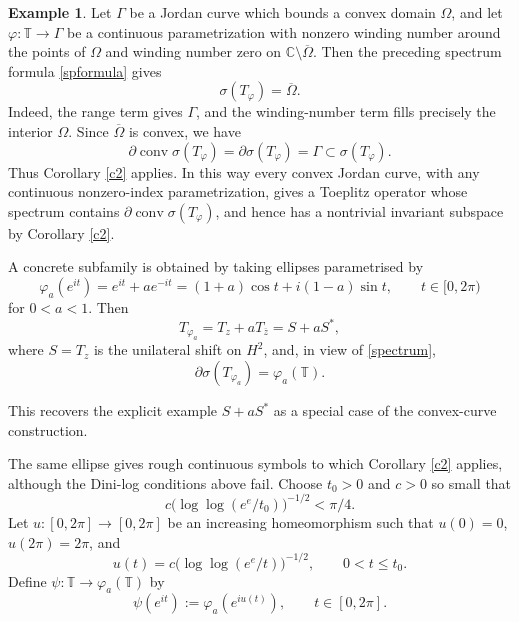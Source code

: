 \documentclass[11pt]{amsart}
\numberwithin{equation}{section}
\theoremstyle{definition}
\newtheorem{example}[theorem]{Example}
\theoremstyle{remark}
\DeclareMathOperator{\conv}{conv}
\newcommand{\CC}{\mathbb{C}}
\newcommand{\TT}{\mathbb{T}}
\begin{document}
\begin{example}\label{ex-convex-jordan-toeplitz}
Let $\Gamma$ be a Jordan curve which bounds a convex domain $\Omega$, and let $\varphi:\TT\to\Gamma$ be a continuous parametrization with nonzero winding number around the points of $\Omega$ and winding number zero on $\CC\setminus\overline\Omega$. Then the preceding spectrum formula \eqref{spformula} gives
\begin{equation}\label{spectrum}
    \sigma(T_\varphi)=\overline\Omega.
\end{equation}
Indeed, the range term gives $\Gamma$, and the winding-number term fills precisely the interior $\Omega$. Since $\overline\Omega$ is convex, we have
$$
\partial\conv\sigma(T_\varphi)=\partial\sigma(T_\varphi)=\Gamma\subset\sigma(T_\varphi).
$$
Thus Corollary \ref{c2} applies. In this way every convex Jordan curve, with any continuous nonzero-index parametrization, gives a Toeplitz operator whose spectrum contains $\partial\operatorname{conv}\sigma(T_\varphi)$, and hence has a nontrivial invariant subspace by Corollary \ref{c2}.

A concrete subfamily is obtained by taking ellipses parametrised by
$$
    \varphi_a(e^{it})=e^{it}+a e^{-it}=(1+a)\cos t+i(1-a)\sin t,\qquad t \in [0,2\pi)
$$
for $0<a<1.$ Then
$$
    T_{\varphi_a}=T_z+aT_{\overline z}=S+aS^*,
$$
where $S=T_z$ is the unilateral shift on $H^2$, 
and, in view of \eqref{spectrum},
$$
\partial \sigma(T_{\varphi_a})= \varphi_a(\mathbb T).
$$

This recovers the explicit example $S+aS^*$ as a special case of the convex-curve construction.

The same ellipse gives rough continuous symbols to which Corollary \ref{c2} applies, although the Dini-log conditions above fail.
Choose $t_0>0$ and $c>0$ so small that
$$
    c\bigl(\log\log(e^e/t_0)\bigr)^{-1/2}<\pi/4.
$$
Let $u:[0,2\pi]\to[0,2\pi]$ be an increasing homeomorphism such that
$u(0)=0$, $u(2\pi)=2\pi$, and
$$
    u(t)=c\bigl(\log\log(e^e/t)\bigr)^{-1/2},
    \qquad 0<t\le t_0 .
$$
Define \(\psi:\mathbb T\to \varphi_a(\mathbb T)\) by
$$
    \psi(e^{it}):=\varphi_a(e^{iu(t)}), \qquad t \in [0,2\pi].
$$



\end{example}
\end{document}
